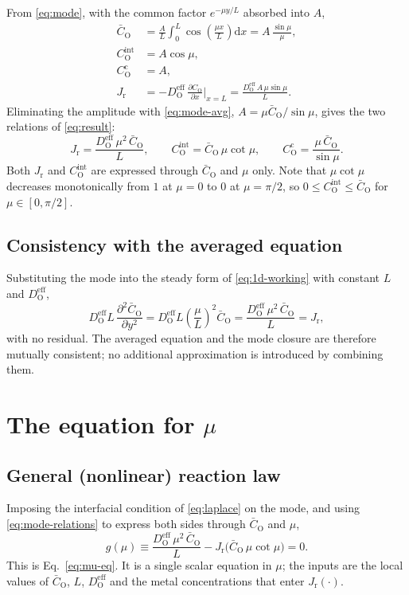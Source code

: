 \documentclass[12pt]{article}
\newcommand{\eff}{\mathrm{eff}}
\newcommand{\intf}{\mathrm{int}}
\newcommand{\Ox}{\mathrm{O}}
\newcommand{\D}{D_{\Ox}^{\eff}}
\newcommand{\Cb}{\bar{C}_{\Ox}}
\newcommand{\Cc}{C_{\Ox}^{\mathrm{c}}}
\newcommand{\Ci}{C_{\Ox}^{\intf}}
\newcommand{\Jr}{J_{\mathrm{r}}}
\newcommand{\dd}{\mathrm{d}}
\begin{document}
From \eqref{eq:mode}, with the common factor $e^{-\mu y/L}$ absorbed into $A$,
\begin{align}
\Cb&=\frac{A}{L}\int_{0}^{L}\cos\!\left(\frac{\mu x}{L}\right)\dd x
    =A\,\frac{\sin\mu}{\mu},
\label{eq:mode-avg}\\
\Ci&=A\cos\mu,
\label{eq:mode-int}\\
\Cc&=A,
\label{eq:mode-center}\\
\Jr&=-\D\,\frac{\partial C_{\Ox}}{\partial x}\bigg|_{x=L}
    =\frac{\D\,A\,\mu\sin\mu}{L}.
\label{eq:mode-flux}
\end{align}
Eliminating the amplitude with \eqref{eq:mode-avg}, $A=\mu\Cb/\sin\mu$, gives the
two relations of \eqref{eq:result}:
\begin{equation}
\Jr=\frac{\D\,\mu^{2}\,\Cb}{L},
\qquad
\Ci=\Cb\,\mu\cot\mu,
\qquad
\Cc=\frac{\mu\,\Cb}{\sin\mu}.
\label{eq:mode-relations}
\end{equation}
Both $\Jr$ and $\Ci$ are expressed through $\Cb$ and $\mu$ only. Note that
$\mu\cot\mu$ decreases monotonically from $1$ at $\mu=0$ to $0$ at $\mu=\pi/2$, so
$0\le\Ci\le\Cb$ for $\mu\in[0,\pi/2]$.

\subsection{Consistency with the averaged equation}

Substituting the mode into the steady form of \eqref{eq:1d-working} with constant
$L$ and $\D$,
\begin{equation}
\D L\,\frac{\partial^2\Cb}{\partial y^2}
 =\D L\left(\frac{\mu}{L}\right)^2\Cb
 =\frac{\D\,\mu^2\,\Cb}{L}
 =\Jr ,
\end{equation}
with no residual. The averaged equation and the mode closure are therefore mutually
consistent; no additional approximation is introduced by combining them.

\section{The equation for $\mu$}
\label{sec:mu}

\subsection{General (nonlinear) reaction law}

Imposing the interfacial condition of \eqref{eq:laplace} on the mode, and using
\eqref{eq:mode-relations} to express both sides through $\Cb$ and $\mu$,
\begin{equation}
g(\mu)\equiv\frac{\D\,\mu^{2}\,\Cb}{L}-\Jr\bigl(\Cb\,\mu\cot\mu\bigr)=0 .
\label{eq:g}
\end{equation}
This is Eq.~\eqref{eq:mu-eq}. It is a single scalar equation in $\mu$; the inputs are
the local values of $\Cb$, $L$, $\D$ and the metal concentrations that enter
$\Jr(\cdot)$.
\end{document}
